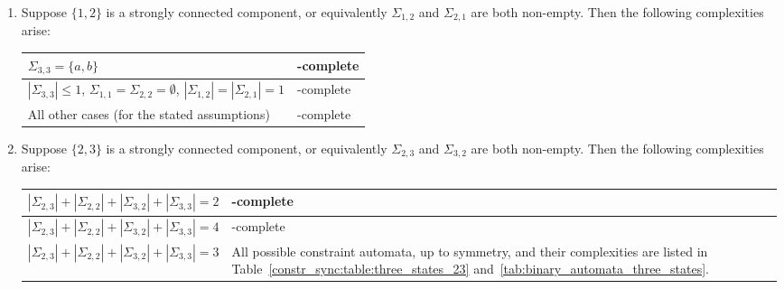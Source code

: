 \begin{theorem}
\begin{enumerate}
		\item Suppose $\{1,2\}$ is a strongly connected component, or equivalently
		$\Sigma_{1,2}$ and $\Sigma_{2,1}$ are both non-empty. 
		Then the following complexities arise:	
				
		\begin{center} 
		\begin{tabular}{l|l}
			$\Sigma_{3,3} = \{a,b\}$ & \NL-complete \\ \hline
			$|\Sigma_{3,3}| \le 1$,
			$\Sigma_{1,1} = \Sigma_{2,2} = \emptyset$,
			$|\Sigma_{1,2}| = |\Sigma_{2,1}| = 1$ & \LOGSPACE-complete \\ \hline
			All other cases (for the stated assumptions) & \PSPACE-complete
		\end{tabular}
		\end{center}		
		
		\item Suppose  $\{2,3\}$ is a strongly connected component, or equivalently
		 $\Sigma_{2,3}$ and $\Sigma_{3,2}$ are both non-empty.
		 Then the following complexities arise:		 
	
		\begin{tabular}{l|p{6cm}}
			$|\Sigma_{2,3}| + |\Sigma_{2,2}| + |\Sigma_{3,2}| + |\Sigma_{3,3}| = 2$ & \LOGSPACE-complete \\ \hline 
			$|\Sigma_{2,3}| + |\Sigma_{2,2}| + |\Sigma_{3,2}| + |\Sigma_{3,3}| = 4$ & \NL-complete \\ \hline 
			$|\Sigma_{2,3}| + |\Sigma_{2,2}| + |\Sigma_{3,2}| + |\Sigma_{3,3}| = 3$ & All possible constraint automata, up to symmetry, and their complexities
			are listed in Table~\ref{constr_sync:table:three_states_23} and~\ref{tab:binary_automata_three_states}.		
		\end{tabular} 
		
	\end{enumerate}
\end{theorem}
